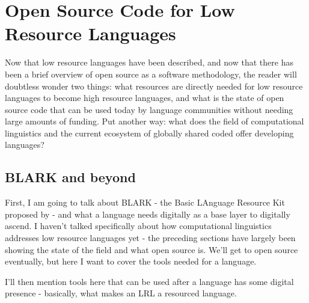 \section{Open Source Code for Low Resource Languages}
\label{sec:endlangcode}

Now that low resource languages have been described, and now that there has been a brief overview of open source as a software methodology, the reader will doubtless wonder two things: what resources are directly needed for low resource languages to become high resource languages, and what is the state of open source code that can be used today by language communities without needing large amounts of funding. Put another way: what does the field of computational linguistics and the current ecosystem of globally shared coded offer developing languages?


\subsection{BLARK and beyond}
\label{subsec:blark-and-beyond}

First, I am going to talk about BLARK - the Basic LAnguage Resource Kit proposed by \citet{krauwer2003basic} - and what a language needs digitally as a base layer to digitally ascend. I haven't talked specifically about how computational linguistics addresses low resource languages yet - the preceding sections have largely been showing the state of the field and what open source is. We'll get to open source eventually, but here I want to cover the tools needed for a language.

I'll then mention tools here that can be used after a language has some digital presence - basically, what makes an LRL a resourced language.


